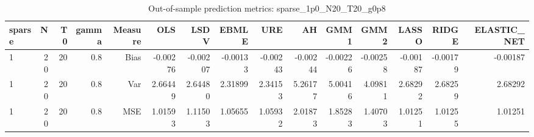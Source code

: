 \begin{table}[!htbp]\centering
\caption{Out-of-sample prediction metrics: sparse_1p0_N20_T20_g0p8}
\label{tab:table3_sparse_1p0_N20_T20_g0p8}
\begin{tabular}{lrrrrrrrrrrrrrr}
\hline
sparse & N & T0 & gamma & Measure & OLS & LSDV & EBMLE & URE & AH & GMM1 & GMM2 & LASSO & RIDGE & ELASTIC_NET \\
\hline
1 & 20 & 20 & 0.8 & Bias & -0.00276 & -0.00207 & -0.00133 & -0.00243 & -0.00244 & -0.00226 & -0.00258 & -0.00187 & -0.00179 & -0.00187 \\
1 & 20 & 20 & 0.8 & Var & 2.66449 & 2.64480 & 2.31899 & 2.34153 & 5.26177 & 5.00416 & 4.09811 & 2.68292 & 2.68259 & 2.68292 \\
1 & 20 & 20 & 0.8 & MSE & 1.01593 & 1.11503 & 1.05655 & 1.05932 & 2.01873 & 1.85283 & 1.40703 & 1.01251 & 1.01255 & 1.01251 \\
\hline
\end{tabular}
\end{table}

